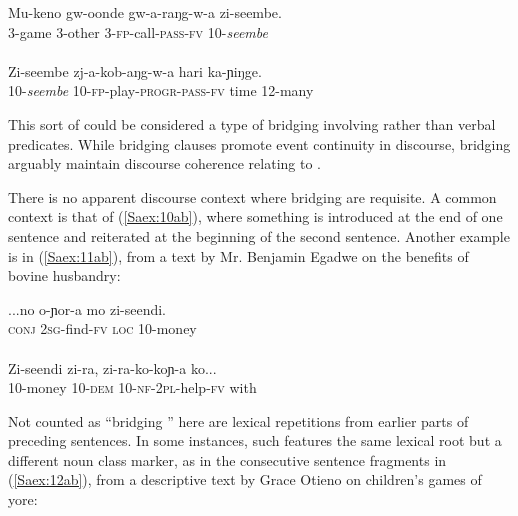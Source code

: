 \documentclass[output=paper]{LSP/langsci}
\begin{document}
\begin{exe}
\ex \label{Saex:10ab}
\begin{xlist}
\ex \label{Saex:10a}
\gll Mu-keno  gw-oonde  gw-a-raŋg-w-a    zi-seembe. \\
\textsc{3}-game    \textsc{3}-other    \textsc{3}-\textsc{fp}-call-\textsc{pass}-\textsc{fv}  \textsc{10}-\textit{seembe}\\
\glt {}\\
\ex \label{Saex:10b}
\gll Zi-seembe  zj-a-kob-aŋg-w-a    hari  ka-ɲiŋge.\\     	       
   \textsc{10}-\textit{seembe}  \textsc{10}-\textsc{fp}-play-\textsc{progr}-\textsc{pass}-\textsc{fv}  time  \textsc{12}-many\\
\glt {} 
\end{xlist}
\end{exe}


This sort of  could be considered a type of bridging involving  rather than verbal predicates. While bridging clauses promote event continuity in discourse, bridging  arguably maintain discourse coherence relating to . 

There is no apparent discourse context where bridging  are requisite. A common context is that of (\ref{Saex:10ab}), where something is introduced at the end of one sentence and reiterated at the beginning of the second sentence. Another example is in (\ref{Saex:11ab}), from a text by Mr. Benjamin Egadwe on the benefits of bovine husbandry:


\begin{exe}
\ex \label{Saex:11ab}
\begin{xlist}
\ex \label{Saex:11a}
\gll ...no  o-ɲor-a   mo   zi-seendi. \\
 \textsc{conj}  \textsc{2sg}-find-\textsc{fv}  \textsc{loc}  \textsc{10}-money\\
\glt {}\\
\ex \label{Saex:11b}
\gll Zi-seendi   zi-ra,     zi-ra-ko-koɲ-a   ko...\\     	       
  \textsc{10}-money  \textsc{10}-\textsc{dem}  \textsc{10}-\textsc{nf-2pl-}help-\textsc{fv}  with\\
\glt {} 
\end{xlist}
\end{exe}


Not counted as ``bridging '' here are lexical repetitions from earlier parts of preceding sentences. In some instances, such  features the same lexical root but a different noun class marker, as in the consecutive sentence fragments in (\ref{Saex:12ab}), from a descriptive text by Grace Otieno on children’s games of yore: 
\end{document}

